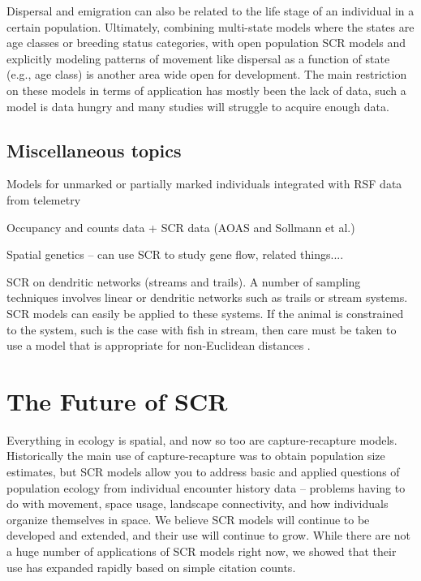 Dispersal and emigration can also be related to the life stage of an individual in
a certain population.  Ultimately, combining multi-state models where the states are 
age classes or breeding status categories, with open population SCR models and explicitly
modeling patterns of movement like dispersal as a function of state (e.g., age class) is 
another area wide open for development.  The main restriction on these models in terms
of application has mostly been the lack of data, such a model is data hungry and many studies
will struggle to acquire enough data.







\subsection{Miscellaneous topics}

Models for unmarked or partially marked individuals integrated with RSF data from telemetry

Occupancy and counts data + SCR data (AOAS and Sollmann et al.)

Spatial genetics -- can use SCR to study gene flow, related things....

SCR on dendritic networks (streams and trails).
A number of sampling techniques involves linear or dendritic networks such as
trails or stream systems.  SCR models can easily be applied to these systems.  
If the animal is constrained to the system, such is the case with fish in stream,
then care must be taken to use a model that is appropriate for non-Euclidean distances
\citep{peterson_etal:2013}. 


\section{The Future of SCR}

Everything in ecology is spatial, and now so too are capture-recapture
models. 
Historically the main use of capture-recapture was to obtain population
size estimates, but
SCR models allow you to address basic and applied questions of
population ecology from individual encounter history data -- problems
having to do with movement, space usage, landscape connectivity, and
how individuals organize themselves in space.
We believe SCR models will continue to be developed and
extended, and their use will continue to grow. While there are not
a huge number of applications of SCR models right now, we showed that
their use has expanded rapidly based on simple citation counts. 

